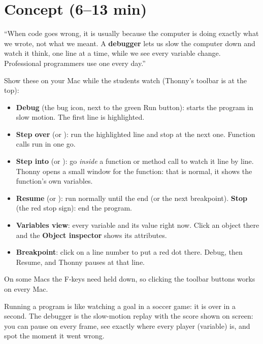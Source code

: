 \section{Concept (6--13 min)}
\begin{teacherscript}
\enquote{When code goes wrong, it is usually because the computer is doing exactly what we wrote, not what we meant. A \textbf{debugger} lets us slow the computer down and watch it think, one line at a time, while we see every variable change. Professional programmers use one every day.}
\end{teacherscript}
Show these on your Mac while the students watch (Thonny's toolbar is at the top):
\begin{itemize}[itemsep=2pt]
  \item \textbf{Debug} (the bug icon, next to the green Run button): starts the program in slow motion. The first line is highlighted.
  \item \textbf{Step over} (or ): run the highlighted line and stop at the next one. Function calls run in one go.
  \item \textbf{Step into} (or ): go \emph{inside} a function or method call to watch it line by line. Thonny opens a small window for the function: that is normal, it shows the function's own variables.
  \item \textbf{Resume} (or ): run normally until the end (or the next breakpoint). \textbf{Stop} (the red stop sign): end the program.
  \item \textbf{Variables view}: every variable and its value right now. Click an object there and the \textbf{Object inspector} shows its attributes.
  \item \textbf{Breakpoint}: click on a line number to put a red dot there. Debug, then Resume, and Thonny pauses at that line.
\end{itemize}
On some Macs the F-keys need  held down, so clicking the toolbar buttons works on every Mac.

\begin{analogy}
Running a program is like watching a goal in a soccer game: it is over in a second. The debugger is the slow-motion replay with the score shown on screen: you can pause on every frame, see exactly where every player (variable) is, and spot the moment it went wrong.
\end{analogy}

